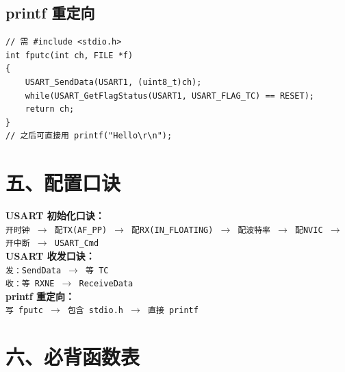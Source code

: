 \documentclass[10pt,a4paper,oneside]{ctexart}
\begin{document}
\subsection*{printf 重定向}

\begin{codebox}
\begin{lstlisting}[style=stm32, numbers=none]
// 需 #include <stdio.h>
int fputc(int ch, FILE *f)
{
    USART_SendData(USART1, (uint8_t)ch);
    while(USART_GetFlagStatus(USART1, USART_FLAG_TC) == RESET);
    return ch;
}
// 之后可直接用 printf("Hello\r\n");
\end{lstlisting}
\end{codebox}

\section*{五、配置口诀}

\begin{tipbox}
    \textbf{USART 初始化口诀：}\\[1mm]
    \texttt{开时钟 $\rightarrow$ 配TX(AF\_PP) $\rightarrow$ 配RX(IN\_FLOATING) $\rightarrow$ 配波特率 $\rightarrow$ 配NVIC $\rightarrow$ 开中断 $\rightarrow$ USART\_Cmd}\\[3mm]

    \textbf{USART 收发口诀：}\\[1mm]
    \texttt{发：SendData $\rightarrow$ 等 TC}\\
    \texttt{收：等 RXNE $\rightarrow$ ReceiveData}\\[1mm]

    \textbf{printf 重定向：}\\
    \texttt{写 fputc $\rightarrow$ 包含 stdio.h $\rightarrow$ 直接 printf}
\end{tipbox}

\section*{六、必背函数表}
\end{document}
